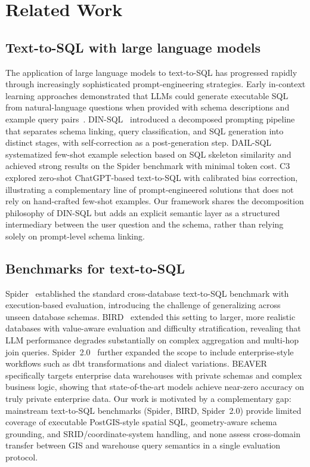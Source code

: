 \documentclass[11pt]{article}
\begin{document}
\section{Related Work}
\label{sec:related}

\subsection{Text-to-SQL with large language models}

The application of large language models to text-to-SQL has progressed rapidly through increasingly sophisticated prompt-engineering strategies. Early in-context learning approaches demonstrated that LLMs could generate executable SQL from natural-language questions when provided with schema descriptions and example query pairs~\cite{yu2018spider,rajkumar2022evaluating}. DIN-SQL~\cite{pourreza2023dinsql} introduced a decomposed prompting pipeline that separates schema linking, query classification, and SQL generation into distinct stages, with self-correction as a post-generation step. DAIL-SQL~\cite{gao2024dail} systematized few-shot example selection based on SQL skeleton similarity and achieved strong results on the Spider benchmark with minimal token cost. C3~\cite{dong2023c3} explored zero-shot ChatGPT-based text-to-SQL with calibrated bias correction, illustrating a complementary line of prompt-engineered solutions that does not rely on hand-crafted few-shot examples. Our framework shares the decomposition philosophy of DIN-SQL but adds an explicit semantic layer as a structured intermediary between the user question and the schema, rather than relying solely on prompt-level schema linking.

\subsection{Benchmarks for text-to-SQL}

Spider~\cite{yu2018spider} established the standard cross-database text-to-SQL benchmark with execution-based evaluation, introducing the challenge of generalizing across unseen database schemas. BIRD~\cite{li2023bird} extended this setting to larger, more realistic databases with value-aware evaluation and difficulty stratification, revealing that LLM performance degrades substantially on complex aggregation and multi-hop join queries. Spider~2.0~\cite{lei2025spider2} further expanded the scope to include enterprise-style workflows such as dbt transformations and dialect variations. BEAVER~\cite{chen2024beaver} specifically targets enterprise data warehouses with private schemas and complex business logic, showing that state-of-the-art models achieve near-zero accuracy on truly private enterprise data. Our work is motivated by a complementary gap: mainstream text-to-SQL benchmarks (Spider, BIRD, Spider~2.0) provide limited coverage of executable PostGIS-style spatial SQL, geometry-aware schema grounding, and SRID/coordinate-system handling, and none assess cross-domain transfer between GIS and warehouse query semantics in a single evaluation protocol.
\end{document}

